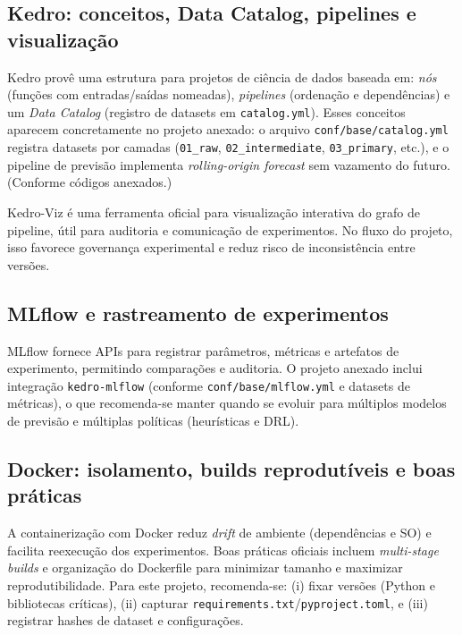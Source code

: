 \subsection{Kedro: conceitos, Data Catalog, pipelines e visualização}

Kedro provê uma estrutura para projetos de ciência de dados baseada em: \emph{nós} (funções com entradas/saídas nomeadas), \emph{pipelines} (ordenação e dependências) e um \emph{Data Catalog} (registro de datasets em \texttt{catalog.yml}). \cite{KedroConcepts,KedroDataCatalogYAML} Esses conceitos aparecem concretamente no projeto anexado: o arquivo \texttt{conf/base/catalog.yml} registra datasets por camadas (\texttt{01\_raw}, \texttt{02\_intermediate}, \texttt{03\_primary}, etc.), e o pipeline de previsão implementa \emph{rolling-origin forecast} sem vazamento do futuro. (Conforme códigos anexados.)

Kedro-Viz é uma ferramenta oficial para visualização interativa do grafo de pipeline, útil para auditoria e comunicação de experimentos. \cite{KedroVizDocs} No fluxo do projeto, isso favorece governança experimental e reduz risco de inconsistência entre versões.

\subsection{MLflow e rastreamento de experimentos}

MLflow fornece APIs para registrar parâmetros, métricas e artefatos de experimento, permitindo comparações e auditoria. \cite{MLflowTrackingAPI} O projeto anexado inclui integração \texttt{kedro-mlflow} (conforme \texttt{conf/base/mlflow.yml} e datasets de métricas), o que recomenda-se manter quando se evoluir para múltiplos modelos de previsão e múltiplas políticas (heurísticas e DRL).

\subsection{Docker: isolamento, builds reprodutíveis e boas práticas}

A containerização com Docker reduz \emph{drift} de ambiente (dependências e SO) e facilita reexecução dos experimentos. Boas práticas oficiais incluem \emph{multi-stage builds} e organização do Dockerfile para minimizar tamanho e maximizar reprodutibilidade. \cite{DockerBuildBestPractices} Para este projeto, recomenda-se: (i) fixar versões (Python e bibliotecas críticas), (ii) capturar \texttt{requirements.txt}/\texttt{pyproject.toml}, e (iii) registrar hashes de dataset e configurações.

